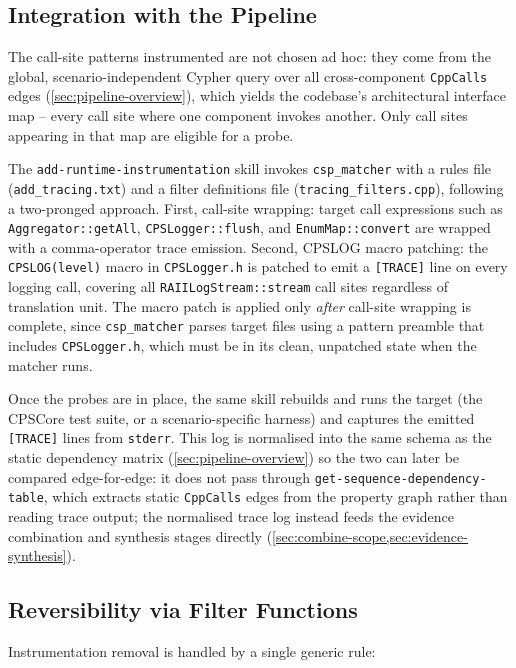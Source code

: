 \subsection{Integration with the Pipeline}

The call-site patterns instrumented are not chosen ad hoc: they come
from the global, scenario-independent Cypher query over all
cross-component \texttt{CppCalls} edges (\cref{sec:pipeline-overview}),
which yields the codebase's architectural interface map -- every call
site where one component invokes another. Only call sites appearing in
that map are eligible for a probe.

The \texttt{add-runtime-instrumentation} skill invokes
\texttt{csp\_matcher} with a rules file (\texttt{add\_tracing.txt}) and a
filter definitions file (\texttt{tracing\_filters.cpp}), following a
two-pronged approach. First, call-site wrapping: target call expressions
such as \texttt{Aggregator::getAll}, \texttt{CPSLogger::flush}, and
\texttt{EnumMap::convert} are wrapped with a comma-operator trace
emission. Second, CPSLOG macro patching: the \texttt{CPSLOG(level)}
macro in \texttt{CPSLogger.h} is patched to emit a \texttt{[TRACE]} line
on every logging call, covering all \texttt{RAIILogStream::stream} call
sites regardless of translation unit. The macro patch is applied only
\emph{after} call-site wrapping is complete, since \texttt{csp\_matcher}
parses target files using a pattern preamble that includes
\texttt{CPSLogger.h}, which must be in its clean, unpatched state when
the matcher runs.

Once the probes are in place, the same skill rebuilds and runs the
target (the CPSCore test suite, or a scenario-specific harness) and
captures the emitted \texttt{[TRACE]} lines from \texttt{stderr}. This
log is normalised into the same schema as the static dependency matrix
(\cref{sec:pipeline-overview}) so the two can later be compared
edge-for-edge: it does not pass through
\texttt{get-sequence-dependency-table}, which extracts static
\texttt{CppCalls} edges from the property graph rather than reading
trace output; the normalised trace log instead feeds the evidence
combination and synthesis stages directly
(\cref{sec:combine-scope,sec:evidence-synthesis}).

\subsection{Reversibility via Filter Functions}\label{sec:reversibility}

Instrumentation removal is handled by a single generic rule:

